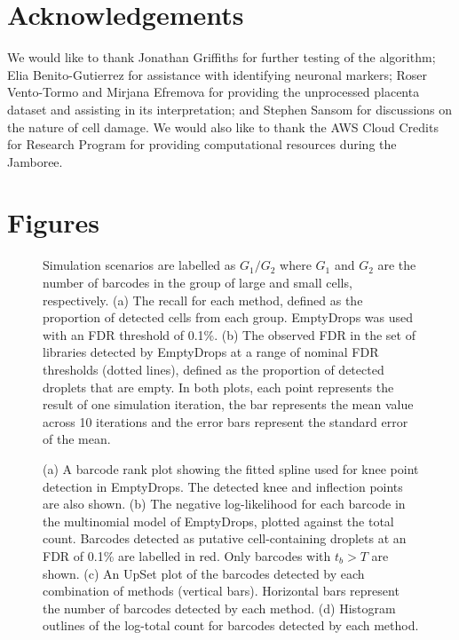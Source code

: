 \documentclass{bmcart}
\begin{document}
\section*{Acknowledgements}
We would like to thank Jonathan Griffiths for further testing of the algorithm;
Elia Benito-Gutierrez for assistance with identifying neuronal markers;
Roser Vento-Tormo and Mirjana Efremova for providing the unprocessed placenta dataset and assisting in its interpretation;
and Stephen Sansom for discussions on the nature of cell damage.
We would also like to thank the AWS Cloud Credits for Research Program for providing computational resources during the Jamboree.

 



\section*{Figures}

\begin{figure}[h!]
\caption{
Simulation scenarios are labelled as $G_1/G_2$ where $G_1$ and $G_2$ are the number of barcodes in the group of large and small cells, respectively.
(a) The recall for each method, defined as the proportion of detected cells from each group.
EmptyDrops was used with an FDR threshold of 0.1\%.
(b) The observed FDR in the set of libraries detected by EmptyDrops at a range of nominal FDR thresholds (dotted lines), defined as the proportion of detected droplets that are empty.
In both plots, each point represents the result of one simulation iteration, the bar represents the mean value across 10 iterations and the error bars represent the standard error of the mean.
}
\label{fig:simpbmc}
\end{figure}

\begin{figure}[h!]
\caption{
(a) A barcode rank plot showing the fitted spline used for knee point detection in EmptyDrops. 
The detected knee and inflection points are also shown.
(b) The negative log-likelihood for each barcode in the multinomial model of EmptyDrops, plotted against the total count.
Barcodes detected as putative cell-containing droplets at an FDR of 0.1\% are labelled in red.
Only barcodes with $t_b > T$ are shown.
(c) An UpSet plot \cite{lex2014upset} of the barcodes detected by each combination of methods (vertical bars).
Horizontal bars represent the number of barcodes detected by each method.
(d) Histogram outlines of the log-total count for barcodes detected by each method.
}
\label{fig:realplacenta}
\end{figure}
\end{document}
